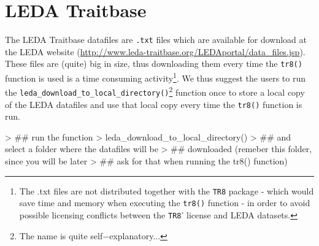 \documentclass{article}
\begin{document}
  



\section{LEDA Traitbase}
\label{sec:leda}

  The LEDA Traitbase datafiles are \texttt{.txt} files which are
  available for download at the LEDA website
  (\url{http://www.leda-traitbase.org/LEDAportal/data_files.jsp}). These
  files are (quite) big in size, thus downloading them every time the
  \texttt{tr8()} function is used is a time consuming
  activity\footnote{The .txt files are not distributed together with the
    \texttt{TR8} package - which would save time and memory when executing
    the \texttt{tr8()} function - in order to avoid possible licensing
    conflicts between the \texttt{TR8}' license and LEDA datasets.}. We
  thus suggest the users to run the
  \texttt{leda\_download\_to\_local\_directory()}\footnote{The name is quite
    self$-$explanatory...} function once to store a local copy of the LEDA
  datafiles and use that local copy every time the \texttt{tr8()} function is run.
  
  
\begin{Schunk}
\begin{Sinput}
> ## run the function
> leda_download_to_local_directory()
> ## and select a folder where the datafiles will be
> ## downloaded (remeber this folder, since you will be later
> ## ask for that when running the tr8() function)
\end{Sinput}
\end{Schunk}

  

  


 

\end{document}
